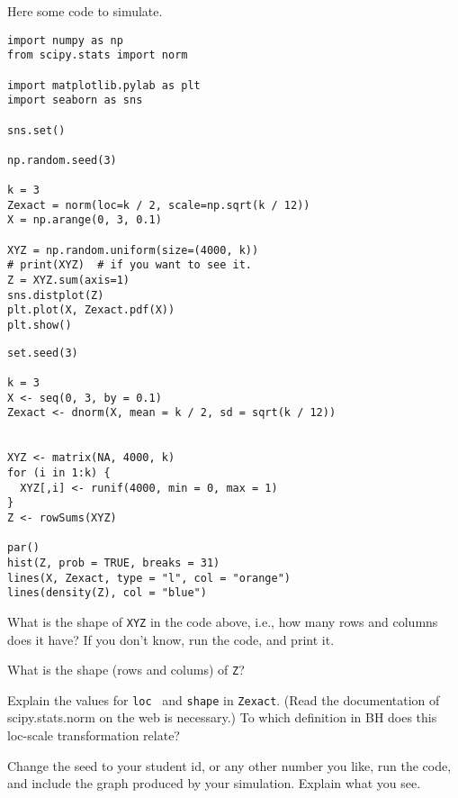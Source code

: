 \documentclass[assignments]{subfiles}
\begin{document}
Here some code to simulate.

\begin{verbatim}
import numpy as np
from scipy.stats import norm

import matplotlib.pylab as plt
import seaborn as sns

sns.set()

np.random.seed(3)

k = 3
Zexact = norm(loc=k / 2, scale=np.sqrt(k / 12))
X = np.arange(0, 3, 0.1)

XYZ = np.random.uniform(size=(4000, k))
# print(XYZ)  # if you want to see it.
Z = XYZ.sum(axis=1)
sns.distplot(Z)
plt.plot(X, Zexact.pdf(X))
plt.show()
\end{verbatim}

\begin{verbatim}
set.seed(3)

k = 3
X <- seq(0, 3, by = 0.1)
Zexact <- dnorm(X, mean = k / 2, sd = sqrt(k / 12))


XYZ <- matrix(NA, 4000, k)
for (i in 1:k) {
  XYZ[,i] <- runif(4000, min = 0, max = 1)
}
Z <- rowSums(XYZ)

par()
hist(Z, prob = TRUE, breaks = 31)
lines(X, Zexact, type = "l", col = "orange")
lines(density(Z), col = "blue")
\end{verbatim}


\begin{exercise}
What is the shape of \verb|XYZ| in the code above, i.e., how many rows and columns does it have? If you don't know, run the code, and print it.
\begin{solution}
\end{solution}
\end{exercise}

\begin{exercise}
What is the shape (rows and colums) of \verb|Z|?
\begin{solution}
\end{solution}
\end{exercise}

\begin{exercise}
Explain the values for \verb|loc|~ and \verb|shape| in \verb|Zexact|.
  (Read the documentation of scipy.stats.norm on the web is necessary.)
  To which definition in BH does this loc-scale transformation relate?
\begin{solution}
\end{solution}
\end{exercise}


\begin{exercise}
Change the seed to your student id, or any other number you like, run the code, and include the graph produced by your simulation.
Explain what you see.
\begin{solution}
\end{solution}
\end{exercise}
\end{document}
